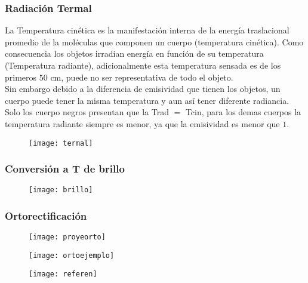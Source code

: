 \documentclass[14pt]{beamer}
\begin{document}
\begin{frame}
\frametitle{Radiación Termal}
\justifying
\scriptsize{La Temperatura cinética es la manifestación interna de la energía traslacional promedio de la moléculas que componen un cuerpo (temperatura cinética). Como consecuencia  los objetos irradian energía en función de su temperatura (Temperatura radiante), adicionalmente esta temperatura sensada es de los primeros $50$ cm, puede no ser representativa de todo el objeto.\\
Sin embargo debido a la diferencia de emisividad que tienen los objetos, un cuerpo puede tener la misma temperatura y aun así tener diferente radiancia. Solo los cuerpo negros presentan que la Trad $=$ Tcin, para los demas cuerpos la temperatura radiante siempre es menor, ya que la emisividad es menor que $1$.}
\begin{figure}
    \centering
    \texttt{[image: termal]}
  \end{figure}
\end{frame}
\begin{frame}
\frametitle{Conversión a T de brillo }
  \begin{figure}
    \centering
    \texttt{[image: brillo]}
  \end{figure}
\end{frame}
\begin{frame}
\frametitle{Ortorectificación}
\scriptsize{}
  \begin{figure}
    \centering
    \texttt{[image: proyeorto]}
  \end{figure}
\end{frame}
\begin{frame}
\scriptsize{}
  \begin{figure}
    \centering
    \texttt{[image: ortoejemplo]}
  \end{figure}
\end{frame}
\begin{frame}
\scriptsize{}
  \begin{figure}
    \centering
    \texttt{[image: referen]}
  \end{figure}
\end{frame}
\end{document}
